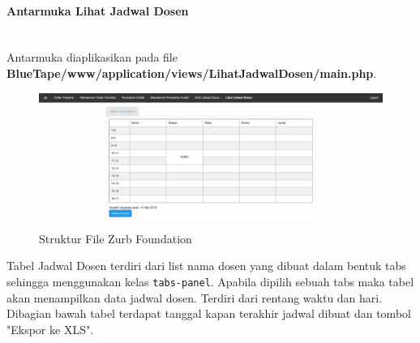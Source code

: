 \documentclass[a4paper,twoside]{article}
\newcommand{\myparagraph}[1]{\paragraph{#1}\mbox{}\\}
\begin{document}
\begin{enumerate}
		\myparagraph{Antarmuka Lihat Jadwal Dosen}
		Antarmuka diaplikasikan pada file \textbf{BlueTape/www/application/views/LihatJadwalDosen/main.php}.
		\begin{figure} [H]
			\centering  
			\includegraphics[scale=0.5]{Tampilan-Lihat-Jadwal-Dosen.png}  
			\caption{Struktur File Zurb Foundation} 	
		\end{figure}
		Tabel Jadwal Dosen terdiri dari list nama dosen yang dibuat dalam bentuk tabs sehingga menggunakan kelas \colorbox{mygray}{\texttt{tabs-panel}}. Apabila dipilih sebuah tabs maka tabel akan menampilkan data jadwal dosen.  Terdiri dari rentang waktu dan hari. Dibagian bawah tabel terdapat tanggal kapan terakhir jadwal dibuat dan tombol "Ekspor ke XLS".
		

\end{enumerate}
\end{document}
